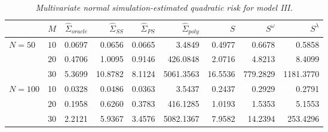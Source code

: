 %
%
\begin{table}[H]
\centering
\caption{\textit{Multivariate normal simulation-estimated quadratic risk  for model III.} }
\begin{tabular}{lrrrrrrrr}
  & $M$ &$\hat{\Sigma}_{oracle}$& $\hat{\Sigma}_{SS}$& $\hat{\Sigma}_{PS}$ & $\hat{\Sigma}_{poly}$ & $S$ &$S^\omega$& $S^\lambda$ \\ 
  \hline
$N = 50$ & $10$ & 0.0697 &0.0656 & 0.0665 &  3.4849 & 0.4977 & 0.6678 & 0.5858 \\ 
    &    $20$ & 0.4706 &1.0095 & 0.9146 &  426.0848 & 2.0716 & 4.8213 & 8.4099 \\ 
    &    $30$ & 5.3699 & 10.8782 & 8.1124 &  5061.3563 & 16.5536 & 779.2829 & 1181.3770 \\ 
     $N = 100$ & 10 & 0.0328 & 0.0486 & 0.0363 &  3.5437 & 0.2437 & 0.2929 & 0.2791 \\ 
     & $20$ &0.1958 & 0.6260 & 0.3783 &  416.1285 & 1.0193 & 1.5353 & 5.1553 \\ 
     & $30$ &2.2121 & 5.9367 & 3.4576 &  5082.1367 & 7.9582 & 14.2394 & 253.4296 \\ 
       \hline
\end{tabular}
\label{table:simulation-1-quad-loss-sigma-3}
\end{table}
